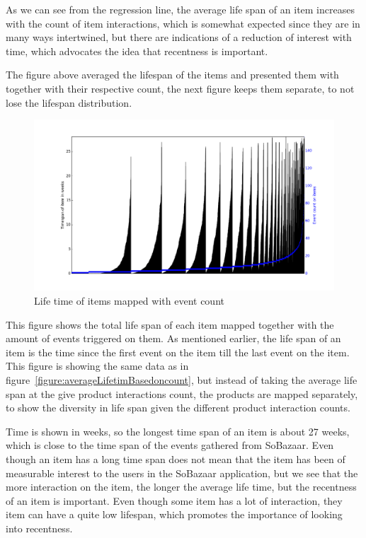         As we can see from the regression line, the average life span of an item increases with the count of item interactions, which is somewhat expected since they are in many ways intertwined, but there are indications of a reduction of interest with time, which advocates the idea that recentness is important.

        The figure above averaged the lifespan of the items and presented them with together with their respective count, the next figure keeps them separate, to not lose the lifespan distribution.

    \begin{figure}[H]
        \includegraphics[width=5in]{image/itemTimeSpansortedoneventcount.png}
        \centering
        \caption{Life time of items mapped with event count}
    \label{figure:itemTimeSpanEventCount}
    \end{figure}
        This figure shows the total life span of each item mapped together with the amount of events triggered on them.
        As mentioned earlier, the life span of an item is the time since the first event on the item till the last event on the item.
        This figure is showing the same data as in figure~\ref{figure:averageLifetimBasedoncount}, but instead of taking the average life span at the give product interactions count, the products are mapped separately, to show the diversity in life span given the different product interaction counts.

        Time is shown in weeks, so the longest time span of an item is about 27 weeks, which is close to the time span of the events gathered from SoBazaar.
        Even though an item has a long time span does not mean that the item has been of measurable interest to the users in the SoBazaar application, but we see that the more interaction on the item, the longer the average life time, but the recentness of an item is important.
        Even though some item has a lot of interaction, they item can have a quite low lifespan, which promotes the importance of looking into recentness.

